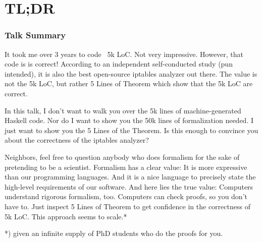 \documentclass[aspectratio=169,t]{beamer}
\begin{document}
\appendix
\backupbegin

\section{TL;DR}

\begin{frame}
	\frametitle{Talk Summary}
	\vspace*{5ex}
	\begin{small}
	It took me over 3 years to code ~5k LoC. Not very impressive. However, that code is is correct! According to an independent self-conducted study (pun intended), it is also the best open-source iptables analyzer out there. The value is not the 5k LoC, but rather 5 Lines of Theorem which show that the 5k LoC are correct.

In this talk, I don’t want to walk you over the 5k lines of machine-generated Haskell code. Nor do I want to show you the 50k lines of formalization needed. I just want to show you the 5 Lines of the Theorem. Is this enough to convince you about the correctness of the iptables analyzer?

Neighbors, feel free to question anybody who does formalism for the sake of pretending to be a scientist. Formalism has a clear value: It is more expressive than our programming languages. And it is a nice language to precisely state the high-level requirements of our software. And here lies the true value: Computers understand rigorous formalism, too. Computers can check proofs, so you don’t have to. Just inspect 5 Lines of Theorem to get confidence in the correctness of 5k LoC. This approach seems to scale.*

*) given an infinite supply of PhD students who do the proofs for you.
	\end{small}
\end{frame}


\backupend
\end{document}

